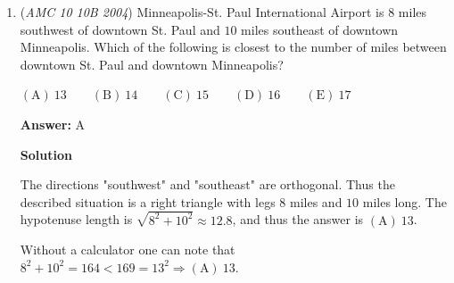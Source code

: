 \begin{enumerate}
 $\mathrm{(A) \ } 5 \qquad \mathrm{(B) \ } 6\qquad \mathrm{(C) \ } 7\qquad \mathrm{(D) \ } 8\qquad \mathrm{(E) \ } 9$

 \textbf{Answer: }A



\textbf{Solution 1}

Isabella had $60+d$ Canadian dollars. Setting up an equation we get $d=\frac{7}{10}\cdot(60+d)$, which solves to $d=140$, and the sum of digits of $d$ is $\boxed{\mathrm{(A)}\ 5}$.

 



\textbf{Solution 2}

Each time Isabella exchanges $7$ U.S. dollars, she gets $7$ Canadian dollars and $3$ Canadian dollars extra. Isabella received a total of $60$ Canadian dollars extra, therefore she exchanged $7$ U.S. dollars $\frac{60}{3}=20$ times. Thus $d=7\cdot20=140$, and the sum of the digits is $\boxed{\mathrm{(A)}\ 5}$.

 



\textbf{Solution 3}

Isabella started with $d$ dollars and ended with $d$ dollars. Therefore,

 $\frac{d}{7}\cdot10-60=d$.

 Solving for $d$, we obtain $d = 140$. The sum of the digits of $d$ is $\boxed{\mathrm{(A)}\ 5}$.

 


	\item (\textit{AMC 10 10B 2004}) Minneapolis-St. Paul International Airport is $8$ miles southwest of downtown St. Paul and $10$ miles southeast of downtown Minneapolis. Which of the following is closest to the number of miles between downtown St. Paul and downtown Minneapolis?


 $\mathrm{(A) \ } 13 \qquad \mathrm{(B) \ } 14\qquad \mathrm{(C) \ } 15\qquad \mathrm{(D) \ } 16\qquad \mathrm{(E) \ } 17$

 \textbf{Answer: }A



\textbf{Solution}

The directions "southwest" and "southeast" are orthogonal. Thus the described situation is a right triangle with legs $8$ miles and $10$ miles long. The hypotenuse length is $\sqrt{8^2 + 10^2}\approx12.8$, and thus the answer is $\boxed{\mathrm{(A)}\ 13}$.

 Without a calculator one can note that $8^2+10^2=164<169=13^2\Rightarrow\boxed{\mathrm{(A)}\ 13}$.


\end{enumerate}
